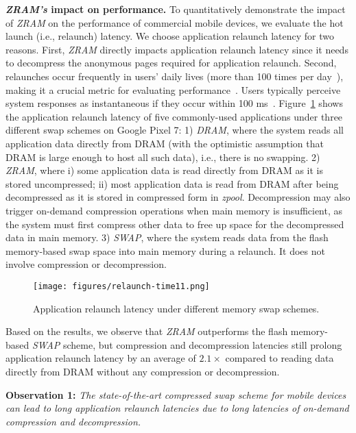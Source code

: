 \noindent\textbf{ \emph{ZRAM's} impact on performance.}  
To quantitatively demonstrate the impact of  \emph{ZRAM} on the performance of commercial mobile devices, we evaluate the hot launch (i.e., relaunch) latency. We choose application relaunch latency for two reasons. First,  \emph{ZRAM} directly impacts application relaunch latency since it needs to decompress the anonymous pages required for application relaunch. Second, relaunches occur frequently in users' daily lives (more than 100 times per day~\cite{deng2019measuring}), making it a crucial metric for evaluating performance~\cite{son2021asap}. Users typically perceive system responses as instantaneous if they occur within 100 ms~\cite{response}.
Figure~\ref{fig:relaunchlatency} shows the application relaunch latency of five commonly-used applications under three different swap schemes on Google Pixel 7: 1)  \emph{DRAM}, where the system reads all application data directly from DRAM (with the optimistic assumption that DRAM is large enough to host all such data), i.e., there is no swapping. 2) \emph{ZRAM}, where i) some application data is read directly from DRAM as it is stored uncompressed; ii) most application data is read from DRAM after being decompressed as it is stored in compressed form in \emph{zpool}.
Decompression may also trigger on-demand compression operations when main memory is insufficient, as the system must first compress other data to free up space for the decompressed data in main memory. 3) \emph{SWAP}, where the system reads data from the flash memory-based swap space into main memory during a relaunch. It does not involve compression or decompression. 

\begin{figure}[!h]
\centering
\texttt{[image: figures/relaunch-time11.png]}
\caption{Application relaunch latency under different memory swap schemes.}
\label{fig:relaunchlatency}
\end{figure}


Based on the results, we observe that  \emph{ZRAM} outperforms the flash memory-based \emph{SWAP} scheme, but compression and decompression latencies still prolong application relaunch latency by an average of $2.1\times$ compared to reading data directly from DRAM without any compression or decompression. 

\noindent\textbf{Observation 1:} \textit{The state-of-the-art compressed swap scheme for mobile devices can lead to long application relaunch latencies due to long latencies of on-demand compression and decompression.} 

